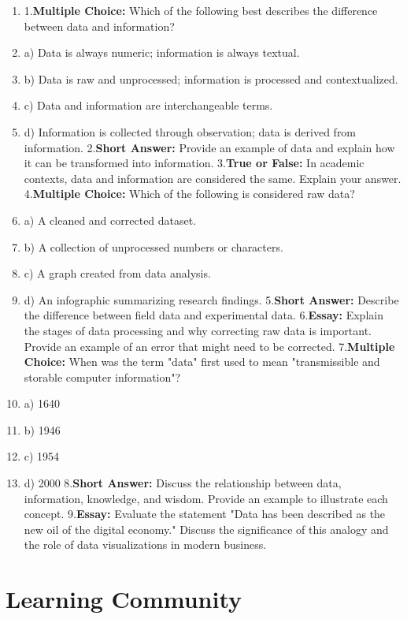 \begin{enumerate}
    \item 1.\textbf{Multiple Choice:} Which of the following best describes the difference between data and information?
    \item a) Data is always numeric; information is always textual.
    \item b) Data is raw and unprocessed; information is processed and contextualized.
    \item c) Data and information are interchangeable terms.
    \item d) Information is collected through observation; data is derived from information. 2.\textbf{Short Answer:} Provide an example of data and explain how it can be transformed into information. 3.\textbf{True or False:} In academic contexts, data and information are considered the same. Explain your answer. 4.\textbf{Multiple Choice:} Which of the following is considered raw data?
    \item a) A cleaned and corrected dataset.
    \item b) A collection of unprocessed numbers or characters.
    \item c) A graph created from data analysis.
    \item d) An infographic summarizing research findings. 5.\textbf{Short Answer:} Describe the difference between field data and experimental data. 6.\textbf{Essay:} Explain the stages of data processing and why correcting raw data is important. Provide an example of an error that might need to be corrected. 7.\textbf{Multiple Choice:} When was the term "data" first used to mean "transmissible and storable computer information"?
    \item a) 1640
    \item b) 1946
    \item c) 1954
    \item d) 2000 8.\textbf{Short Answer:} Discuss the relationship between data, information, knowledge, and wisdom. Provide an example to illustrate each concept. 9.\textbf{Essay:} Evaluate the statement "Data has been described as the new oil of the digital economy." Discuss the significance of this analogy and the role of data visualizations in modern business.
\end{enumerate}

\section{Learning Community}
\label{sec:learning-community}

